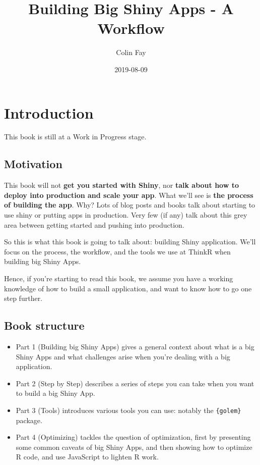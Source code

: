 \documentclass[]{book}
\title{Building Big Shiny Apps - A Workflow}
\author{Colin Fay}
\date{2019-08-09}
\begin{document}
\maketitle

{
\setcounter{tocdepth}{1}
\tableofcontents
}
\hypertarget{introduction}{%
\chapter*{Introduction}\label{introduction}}

This book is still at a Work in Progress stage.

\hypertarget{motivation}{%
\section*{Motivation}\label{motivation}}

This book will not \textbf{get you started with Shiny}, nor \textbf{talk about how to deploy into production and scale your app}. What we'll see is \textbf{the process of building the app}. Why? Lots of blog posts and books talk about starting to use shiny or putting apps in production. Very few (if any) talk about this grey area between getting started and pushing into production.

So this is what this book is going to talk about: building Shiny application. We'll focus on the process, the workflow, and the tools we use at ThinkR when building big Shiny Apps.

Hence, if you're starting to read this book, we assume you have a working knowledge of how to build a small application, and want to know how to go one step further.

\hypertarget{book-structure}{%
\section*{Book structure}\label{book-structure}}

\begin{itemize}
\item
  Part 1 (Building big Shiny Apps) gives a general context about what is a big Shiny Apps and what challenges arise when you're dealing with a big application.
\item
  Part 2 (Step by Step) describes a series of steps you can take when you want to build a big Shiny App.
\item
  Part 3 (Tools) introduces various tools you can use: notably the \texttt{\{golem\}} package.
\item
  Part 4 (Optimizing) tackles the question of optimization, first by presenting some common caveats of big Shiny Apps, and then showing how to optimize R code, and use JavaScript to lighten R work.
\end{itemize}
\end{document}
